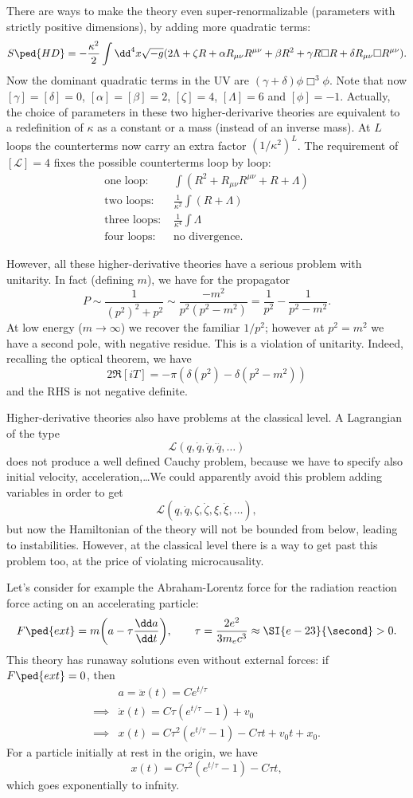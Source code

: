 \documentclass[a4paper,12pt]{book}
\begin{document}
There are ways to make the theory even super-renormalizable (parameters with strictly positive dimensions), by adding more quadratic terms:
\[S\ped{HD}=-\frac{\kappa^2}{2}\int\dd^4x\sqrt{-g}(2\Lambda+\zeta R+\alpha R_{\mu\nu}R^{\mu\nu}+\beta R^2+\gamma R\Box R+\delta R_{\mu\nu}\Box R^{\mu\nu}).\]
Now the dominant quadratic terms in the UV are $(\gamma+\delta)\phi\Box^3\phi$. Note that now $[\gamma]=[\delta]=0$, $[\alpha]=[\beta]=2$, $[\zeta]=4$, $[\Lambda]=6$ and $[\phi]=-1$. Actually, the choice of parameters in these two higher-derivarive theories are equivalent to a redefinition of $\kappa$ as a constant or a mass (instead of an inverse mass). At $L$ loops the counterterms now carry an extra factor $(1/\kappa^2)^L$. The requirement of $[\mathcal L]=4$ fixes the possible counterterms loop by loop:
\begin{align*}
\text{one loop: }&\int(R^2+R_{\mu\nu}R^{\mu\nu}+R+\Lambda)\\
\text{two loops: }&\frac1{\kappa^2}\int(R+\Lambda)\\
\text{three loops: }&\frac1{\kappa^4}\int\Lambda\\
\text{four loops: }&\text{no divergence.}
\end{align*}

However, all these higher-derivative theories have a serious problem with unitarity. In fact (defining $m$), we have for the propagator
\[P\sim\frac1{(p^2)^2+p^2}\sim\frac{-m^2}{p^2(p^2-m^2)}=\frac1{p^2}-\frac1{p^2-m^2}.\]
At low energy ($m\to\infty$) we recover the familiar $1/p^2$; however at $p^2=m^2$ we have a second pole, with negative residue. This is a violation of unitarity. Indeed, recalling the optical theorem, we have
\[2\Re[iT]=-\pi(\delta(p^2)-\delta(p^2-m^2))\]
and the RHS is not negative definite.

Higher-derivative theories also have problems at the classical level. A Lagrangian of the type
\[\mathcal L(q,\dot q, \ddot q, \dddot q,\ldots)\]
does not produce a well defined Cauchy problem, because we have to specify also initial velocity, acceleration,\ldots We could apparently avoid this problem adding variables in order to get
\[\mathcal L(q, \dot q, \zeta, \dot\zeta, \xi, \dot\xi,\ldots),\]
but now the Hamiltonian of the theory will not be bounded from below, leading to instabilities. However, at the classical level there is a way to get past this problem too, at the price of violating microcausality.

Let's consider for example the Abraham-Lorentz force for the radiation reaction force acting on an accelerating particle:
\[F\ped{ext}=m\biggl(a-\tau\frac{\dd a}{\dd t}\biggr),\qquad \tau=\frac{2e^2}{3m_ec^3}\approx\SI{e-23}{\second}>0.\]
This theory has runaway solutions even without external forces: if $F\ped{ext}=0$, then
\begin{align*}
&a=\ddot x(t)=Ce^{t/\tau}\\
\implies&\dot x(t)=C\tau(e^{t/\tau}-1)+v_0\\
\implies&x(t)=C\tau^2(e^{t/\tau}-1)-C\tau t+v_0t+x_0.
\end{align*}
For a particle initially at rest in the origin, we have
\[x(t)=C\tau^2(e^{t/\tau}-1)-C\tau t,\]
which goes exponentially to infnity.
\end{document}
